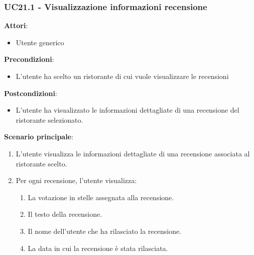 \subsubsection{UC21.1 - Visualizzazione informazioni recensione}\label{usecase:21_1}
\textbf{Attori}:
\begin{itemize}
    \item Utente generico
\end{itemize}
\textbf{Precondizioni}:
\begin{itemize}
    \item L'utente ha scelto un ristorante di cui vuole visualizzare le recensioni
\end{itemize}
\textbf{Postcondizioni}:
\begin{itemize}
    \item L'utente ha visualizzato le informazioni dettagliate di una recensione del ristorante selezionato.
\end{itemize}
\textbf{Scenario principale}:
\begin{enumerate}
    \item L'utente visualizza le informazioni dettagliate di una recensione associata al ristorante scelto.
    \item Per ogni recensione, l'utente visualizza:
    \begin{enumerate}
        \item La votazione in stelle assegnata alla recensione.
        \item Il testo della recensione.
        \item Il nome dell'utente che ha rilasciato la recensione.
        \item La data in cui la recensione è stata rilasciata.
    \end{enumerate}
\end{enumerate}

\newpage
